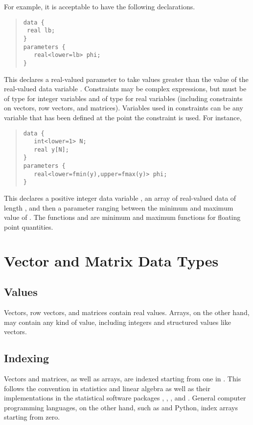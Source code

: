 For example, it is acceptable to have the
following declarations.
%
\begin{quote}
\begin{Verbatim}[fontsize=\small]
data { 
 real lb;
}
parameters {
   real<lower=lb> phi;
}
\end{Verbatim}
\end{quote}
%
This declares a real-valued parameter  to take values
greater than the value of the real-valued data variable .
Constraints may be complex expressions, but must be of type 
for integer variables and of type  for real variables
(including constraints on vectors, row vectors, and matrices).
Variables used in constraints can be any variable that has been
defined at the point the constraint is used.  For instance,
\begin{quote}
\begin{Verbatim}[fontsize=\small]
data { 
   int<lower=1> N;
   real y[N];
}
parameters {
   real<lower=fmin(y),upper=fmax(y)> phi;
}
\end{Verbatim}
\end{quote}
%
This declares a positive integer data variable , an array
 of real-valued data of length , and then a parameter
ranging between the minimum and maximum value of .  The
functions  and  are minimum and maximum
functions for floating point quantities.


\section{Vector and Matrix Data Types}

\subsection{Values}

Vectors, row vectors, and matrices contain real values.  Arrays, on
the other hand, may contain any kind of value, including integers and
structured values like vectors.


\subsection{Indexing}

Vectors and matrices, as well as arrays, are indexed starting from one
in \Stan.  This follows the convention in statistics and linear
algebra as well as their implementations in the statistical software
packages \R, \MATLAB, \BUGS, and \JAGS.  General computer programming
languages, on the other hand, such as \Cpp and Python, index arrays
starting from zero.


